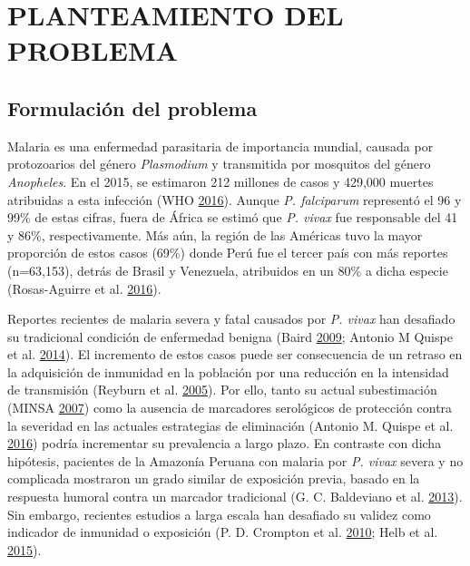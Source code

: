 \documentclass[a4paper]{article}
\begin{document}
\section{PLANTEAMIENTO DEL PROBLEMA}\label{planteamiento-del-problema}

\subsection{Formulación del problema}\label{intro}

Malaria es una enfermedad parasitaria de importancia mundial, causada
por protozoarios del género \emph{Plasmodium} y transmitida por
mosquitos del género \emph{Anopheles}. En el 2015, se estimaron 212
millones de casos y 429,000 muertes atribuidas a esta infección (WHO
\protect\hyperlink{ref-WHO2016world}{2016}). Aunque \emph{P. falciparum}
representó el 96 y 99\% de estas cifras, fuera de África se estimó que
\emph{P. vivax} fue responsable del 41 y 86\%, respectivamente. Más aún,
la región de las Américas tuvo la mayor proporción de estos casos (69\%)
donde Perú fue el tercer país con más reportes (n=63,153), detrás de
Brasil y Venezuela, atribuidos en un 80\% a dicha especie (Rosas-Aguirre
et al. \protect\hyperlink{ref-rosas2016peru}{2016}).

Reportes recientes de malaria severa y fatal causados por \emph{P.
vivax} han desafiado su tradicional condición de enfermedad benigna
(Baird \protect\hyperlink{ref-baird2009}{2009}; Antonio M Quispe et al.
\protect\hyperlink{ref-quispe2014}{2014}). El incremento de estos casos
puede ser consecuencia de un retraso en la adquisición de inmunidad en
la población por una reducción en la intensidad de transmisión (Reyburn
et al. \protect\hyperlink{ref-reyburn2015}{2005}). Por ello, tanto su
actual subestimación (MINSA \protect\hyperlink{ref-norma2001}{2007})
como la ausencia de marcadores serológicos de protección contra la
severidad en las actuales estrategias de eliminación (Antonio M. Quispe
et al. \protect\hyperlink{ref-accelerate2016}{2016}) podría incrementar
su prevalencia a largo plazo. En contraste con dicha hipótesis,
pacientes de la Amazonía Peruana con malaria por \emph{P. vivax} severa
y no complicada mostraron un grado similar de exposición previa, basado
en la respuesta humoral contra un marcador tradicional (G. C. Baldeviano
et al. \protect\hyperlink{ref-baldevi2013}{2013}). Sin embargo,
recientes estudios a larga escala han desafiado su validez como
indicador de inmunidad o exposición (P. D. Crompton et al.
\protect\hyperlink{ref-crompton2010}{2010}; Helb et al.
\protect\hyperlink{ref-Helb2015exposure}{2015}).
\end{document}
